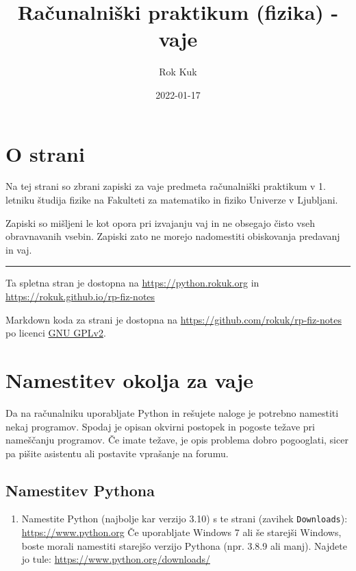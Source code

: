 \documentclass[
]{book}
\title{Računalniški praktikum (fizika) - vaje}
\author{Rok Kuk}
\date{2022-01-17}
\providecommand{\tightlist}{%
  \setlength{\itemsep}{0pt}\setlength{\parskip}{0pt}}
\begin{document}
\maketitle

{
\setcounter{tocdepth}{1}
\tableofcontents
}
\hypertarget{o-strani}{%
\chapter*{O strani}\label{o-strani}}

Na tej strani so zbrani zapiski za vaje predmeta računalniški praktikum v 1. letniku študija fizike na Fakulteti za matematiko in fiziko Univerze v Ljubljani.

Zapiski so mišljeni le kot opora pri izvajanju vaj in ne obsegajo čisto vseh obravnavanih vsebin. Zapiski zato ne morejo nadomestiti obiskovanja predavanj in vaj.

\begin{center}\rule{0.5\linewidth}{0.5pt}\end{center}

Ta spletna stran je dostopna na \url{https://python.rokuk.org} in
\url{https://rokuk.github.io/rp-fiz-notes}

Markdown koda za strani je dostopna na \url{https://github.com/rokuk/rp-fiz-notes}
po licenci \href{https://github.com/rokuk/rp-fiz-notes/blob/main/LICENSE}{GNU GPLv2}.

\hypertarget{namestitev-okolja-za-vaje}{%
\chapter{Namestitev okolja za vaje}\label{namestitev-okolja-za-vaje}}

Da na računalniku uporabljate Python in rešujete naloge je potrebno namestiti
nekaj programov. Spodaj je opisan okvirni postopek in pogoste težave pri nameščanju
programov. Če imate težave, je opis problema dobro pogooglati, sicer pa pišite
asistentu ali postavite vprašanje na forumu.

\hypertarget{namestitev-pythona}{%
\section{Namestitev Pythona}\label{namestitev-pythona}}

\begin{enumerate}
\def\labelenumi{\arabic{enumi}.}
\tightlist
\item
  Namestite Python (najbolje kar verzijo 3.10) s te strani (zavihek \texttt{Downloads}): \url{https://www.python.org}
  Če uporabljate Windows 7 ali še starejši Windows, boste morali namestiti
  starejšo verzijo Pythona (npr. 3.8.9 ali manj). Najdete jo tule: \url{https://www.python.org/downloads/}
\end{enumerate}
\end{document}
